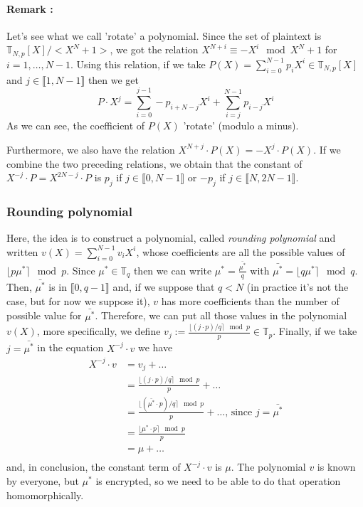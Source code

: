 \documentclass{article}
\newcommand{\T}{\mathbb{T}}
\newcommand{\round}[1]{\lfloor#1\rceil}
\theoremstyle{definition}
\theoremstyle{Theorem}
\begin{document}
\paragraph{Remark :} Let's see what we call 'rotate' a polynomial. Since the set of plaintext is $\T_{N,p}[X]/<X^N+1>$, we got the relation $X^{N+i}\equiv-X^i\mod X^N+1$ for $i=1,\dots, N-1$. Using this relation, if we take $P(X) = \sum_{i=0}^{N-1}p_iX^i \in \T_{N,p}[X]$ and $j\in\llbracket 1,N-1\rrbracket$ then we get 
$$P\cdot X^j = \sum_{i=0}^{j-1}-p_{i+N-j}X^i + \sum_{i=j}^{N-1} p_{i-j}X^i$$
As we can see, the coefficient of $P(X)$ 'rotate' (modulo a minus).

Furthermore, we also have the relation $X^{N+j}\cdot P(X) = -X^j \cdot P(X)$. 
If we combine the two preceding relations, we obtain that the constant of $X^{-j}\cdot P = X^{2N-j}\cdot P$ is $p_j$ if $j\in\llbracket0, N-1\rrbracket$ or $-p_j$ if $j\in\llbracket N, 2N-1\rrbracket$.

\subsubsection{Rounding polynomial} \label{rounding polynomial}

Here, the idea is to construct a polynomial, called \textit{rounding polynomial} and written $v(X) = \sum_{i=0}^{N-1}v_iX^i$, whose coefficients are all the possible values of $\round{p\mu^*}\mod p$. Since $\mu^*\in\T_q$ then we can write $\mu^*=\frac{\bar{\mu^*}}{q}$ with $\bar{\mu^*} = \round{q\mu^*}\mod q$. Then, $\bar{\mu^*}$ is in $\llbracket 0, q-1 \rrbracket$ and, if we suppose that $q<N$ (in practice it's not the case, but for now we suppose it), $v$ has more coefficients than the number of possible value for $\bar{\mu^*}$. Therefore, we can put all those values in the polynomial $v(X)$, more specifically, we define $v_j:= \frac{\round{(j\cdot p)/q}\mod p}{p} \in \T_p$. Finally, if we take $j=\bar{\mu^*}$ in the equation $X^{-j}\cdot v$ we have 
\begin{equation}
\begin{split}
    X^{-j}\cdot v &= v_j + \ldots\\
    &= \frac{\round{(j \cdot p)/q}\mod p}{p} + \ldots\\
    &= \frac{\round{(\bar{\mu^*} \cdot p)/q}\mod p}{p} + \ldots \text{, since } j=\bar{\mu^*}\\
    &= \frac{\round{\mu^* \cdot p}\mod p}{p}\\
    &= \mu + \ldots\\
\end{split}
\end{equation}
and, in conclusion, the constant term of $X^{-j}\cdot v$ is $\mu$. The polynomial $v$ is known by everyone, but $\mu^*$ is encrypted, so we need to be able to do that operation homomorphically.
\end{document}

